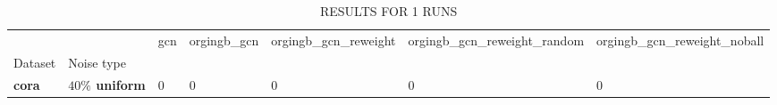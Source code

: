 \begin{table}
\caption{RESULTS FOR 1 RUNS}
\begin{tabular}{lllllll}
\toprule
 &  & gcn & orgingb_gcn & orgingb_gcn_reweight & orgingb_gcn_reweight_random & orgingb_gcn_reweight_noball \\
Dataset & Noise type &  &  &  &  &  \\
\midrule
\textbf{cora} & \textbf{$ 40 \% $ uniform} & 0 & 0 & 0 & 0 & 0 \\
\cline{1-7}
\bottomrule
\end{tabular}
\end{table}
